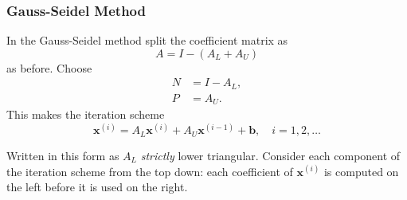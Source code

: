 \documentclass{beamer}
\newcommand{\bb}{{\boldsymbol{b}}}
\newcommand{\bx}{{\boldsymbol{x}}}
\begin{document}
\begin{frame}
  \frametitle{Gauss-Seidel Method}

  In the Gauss-Seidel method split the coefficient matrix as
  \begin{equation*}
    A = I - (A_L + A_U)
  \end{equation*}
  as before. Choose
  \begin{align*}
    N & = I - A_L, \\
    P & = A_U.
  \end{align*}
  This makes the iteration scheme
  \begin{equation*}
    \bx^{(i)} =  A_L \bx^{(i)} + A_U \bx^{(i - 1)} + \bb, \quad i = 1,
    2, \dots
  \end{equation*} \pause

  Written in this form as $A_L$ \emph{strictly} lower
  triangular. Consider each component of the iteration scheme from the
  top down: each coefficient of $\bx^{(i)}$ is computed on the left
  before it is used on the right.

\end{frame}
\end{document}
